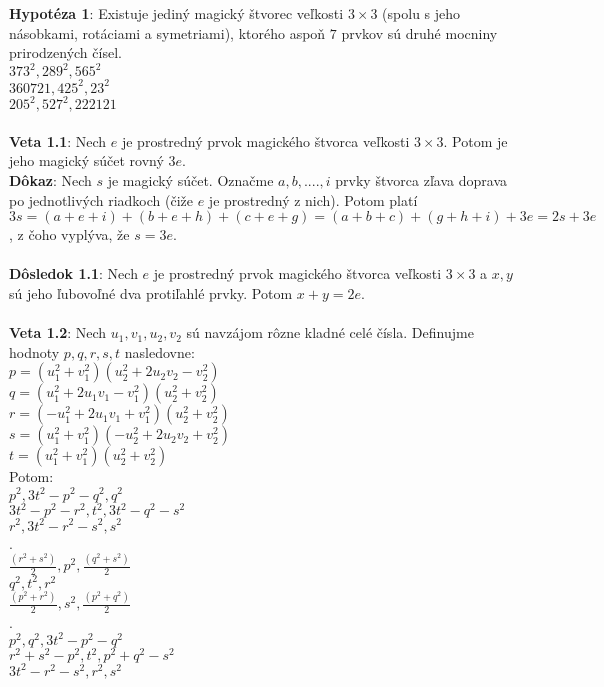 \documentclass[12pt]{article}
\begin{document}
\textbf{Hypotéza 1}: Existuje jediný magický štvorec veľkosti $3 \times 3$ (spolu s jeho násobkami, rotáciami a symetriami), ktorého aspoň $7$ prvkov sú druhé mocniny prirodzených čísel. \\
$373^2, 289^2, 565^2$ \\
$360721, 425^2, 23^2$ \\
$205^2, 527^2, 222121$ \\\\

\textbf{Veta 1.1}: Nech $e$ je prostredný prvok magického štvorca veľkosti $3 \times 3$. Potom je jeho magický súčet rovný $3e$. \\

\textbf{Dôkaz}: Nech $s$ je magický súčet. Označme $a, b, .... , i$ prvky štvorca zľava doprava po jednotlivých riadkoch (čiže $e$ je prostredný z nich). Potom platí $3s = (a + e + i) + (b + e + h) + (c + e + g) = (a + b + c) + (g + h + i) + 3e = 2s + 3e$, z čoho vyplýva, že $s = 3e$. \\\\

\textbf{Dôsledok 1.1}: Nech $e$ je prostredný prvok magického štvorca veľkosti $3 \times 3$ a $x,y$ sú jeho ľubovoľné dva protiľahlé prvky. Potom $x + y = 2e$. \\\\

\textbf{Veta 1.2}: Nech $u_1, v_1, u_2, v_2$ sú navzájom rôzne kladné celé čísla. Definujme hodnoty $p,q,r,s,t$ nasledovne: \\
$p = (u_1^2 + v_1^2)(u_2^2 + 2u_2 v_2 - v_2^2)$ \\
$q = (u_1^2 + 2u_1 v_1 - v_1^2)(u_2^2 + v_2^2)$ \\
$r = (- u_1^2 + 2u_1 v_1 + v_1^2)(u_2^2 + v_2^2)$ \\
$s = (u_1^2 + v_1^2)(-u_2^2 + 2u_2 v_2 + v_2^2)$ \\
$t = (u_1^2 + v_1^2)(u_2^2 + v_2^2)$ \\

Potom: \\
$p^2, 3t^2 - p^2 - q^2, q^2$ \\
$3t^2 - p^2 - r^2, t^2, 3t^2 - q^2 - s^2$ \\
$r^2, 3t^2 - r^2 - s^2, s^2$ \\
.\\
$\frac{(r^2 + s^2)}{2}, p^2, \frac{(q^2 + s^2)}{2}$ \\
$q^2, t^2, r^2$ \\
$\frac{(p^2 + r^2)}{2}, s^2, \frac{(p^2 + q^2)}{2}$ \\
.\\
$p^2, q^2, 3t^2 - p^2 - q^2$ \\
$r^2 + s^2 - p^2, t^2, p^2 + q^2 - s^2$ \\
$3t^2 - r^2 - s^2, r^2, s^2$ \\
\end{document}
